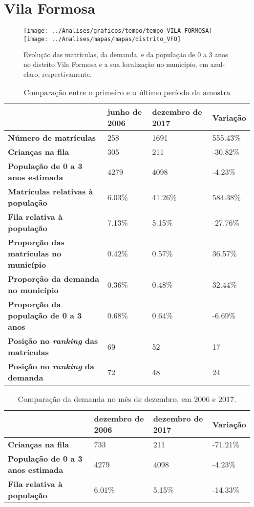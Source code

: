 \section{Vila Formosa}
\begin{figure}[H]
\centering
\texttt{[image: ../Analises/graficos/tempo/tempo\_VILA\_FORMOSA]}
\texttt{[image: ../Analises/mapas/mapas/distrito\_VFO]}
\caption{Evolução das matrículas, da demanda, e da população de 0 a 3 anos no distrito Vila Formosa e a sua localização no município, em azul-claro, respectivamente.}
\end{figure}
\begin{table}[H]
\begin{tabular}{l|l|l|l}
\textbf{}                                      & \textbf{junho de 2006}       & \textbf{dezembro de 2017}    & \textbf{Variação} \\ \hline
\textbf{Número de matrículas}                  & 258 & 1691 & 555.43\% \\ \hline
\textbf{Crianças na fila}                      & 305 & 211 & -30.82\% \\ \hline
\textbf{População de 0 a 3 anos estimada}      & 4279 & 4098 & -4.23\% \\ \hline
\textbf{Matrículas relativas à população}      & 6.03\% & 41.26\% & 584.38\% \\ \hline
\textbf{Fila relativa à população}             & 7.13\% & 5.15\% & -27.76\% \\ \hline
\textbf{Proporção das matrículas no município} & 0.42\% & 0.57\% & 36.57\% \\ \hline
\textbf{Proporção da demanda no município}     & 0.36\% & 0.48\% & 32.44\% \\ \hline
\textbf{Proporção da população de 0 a 3 anos}  & 0.68\% & 0.64\% & -6.69\% \\ \hline
\textbf{Posição no \textit{ranking} das matrículas}     & 69 & 52 & 17 \\ \hline
\textbf{Posição no \textit{ranking} da demanda}         & 72 & 48 & 24 \\ 
\end{tabular}
\caption{Comparação entre o primeiro e o último período da amostra}
\end{table}
\begin{table}[H]
\begin{tabular}{l|l|l|l}
\textbf{}                                 & \textbf{dezembro de 2006} & \textbf{dezembro de 2017} & \textbf{Variação} \\ \hline
\textbf{Crianças na fila}                      & 733 & 211 & -71.21\% \\ \hline
\textbf{População de 0 a 3 anos estimada}      & 4279 & 4098 & -4.23\% \\ \hline
\textbf{Fila relativa à população}             & 6.01\% & 5.15\% & -14.33\% \\
\end{tabular}
\caption{Comparação da demanda no mês de dezembro, em 2006 e 2017.}
\end{table}
